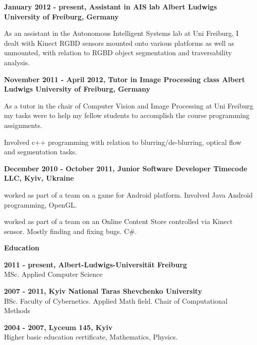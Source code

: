 \documentclass[a4paper,12pt,final]{memoir}
\newcommand{\Sep}{\vspace{1.5em}}
\newcommand{\SmallSep}{\vspace{0.5em}}
\newcommand{\CVSection}[1]
	{\Large\textbf{#1}\par
	\SmallSep\normalsize\normalfont}
\newcommand{\CVItem}[1]
	{\textbf{\color{MidnightBlue} #1}}
\begin{document}
\CVItem{January 2012 - present, Assistant in AIS lab
\newline Albert Ludwigs University of Freiburg, Germany}
\begin{compactitem}[\color{RoyalBlue}$\circ$]
\item As an assistant in the Autonomous Intelligent Systems lab at Uni Freiburg, I dealt with Kinect RGBD sensors mounted onto various platforms as well as unmounted, with relation to RGBD object segmentation and traversability analysis. 
\end{compactitem}
\SmallSep

\CVItem{November 2011 - April 2012, Tutor in Image Processing class
\newline Albert Ludwigs University of Freiburg, Germany}
\begin{compactitem}[\color{RoyalBlue}$\circ$]
\item As a tutor in the chair of Computer Vision and Image Processing at Uni Freiburg my tasks were to help my fellow students to accomplish the course programming assignments. 
\item Involved c++ programming with relation to blurring/de-blurring, optical flow and segmentation tasks.
\end{compactitem}
\SmallSep

\CVItem{December 2010 - October 2011, Junior Software Developer
\newline Timecode LLC, Kyiv, Ukraine}
\begin{compactitem}[\color{MidnightBlue}$\circ$]
\item worked as part of a team on a game for Android platform. Involved Java Android programming, OpenGL.
\item worked as part of a team on an Online Content Store controlled via Kinect sensor. Mostly finding and fixing bugs. C\#.
\end{compactitem}
\Sep

\CVSection{Education}
\CVItem{2011 - present, Albert-Ludwigs-Universität Freiburg}\\
MSc. Applied Computer Science
\SmallSep

\CVItem{2007 - 2011, Kyiv National Taras Shevchenko University}\\
BSc. Faculty of Cybernetics. Applied Math field. 
\newline Chair of Computational Methods
\SmallSep

\CVItem{2004 - 2007, Lyceum 145, Kyiv}\\
Higher basic education certificate, Mathematics, Physics.
\Sep
\clearpage
\framebreak
\framebreak
\end{document}
